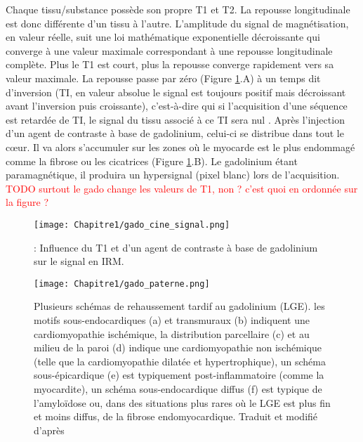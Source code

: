 Chaque tissu/substance possède son propre T1 et T2. La repousse longitudinale est donc différente d’un tissu à l’autre. L’amplitude du signal de magnétisation, en valeur réelle, suit une loi mathématique exponentielle décroissante qui converge à une valeur maximale correspondant à une repousse longitudinale complète. Plus le T1 est court, plus la repousse converge rapidement vers sa valeur maximale. La repousse passe par zéro (Figure \ref{fig:gado}.A) à un temps dit d’inversion (TI, en valeur absolue le signal est toujours positif mais décroissant avant l’inversion puis croissante), c’est-à-dire qui si l’acquisition d’une séquence est retardée de TI, le signal du tissu associé à ce TI sera nul \cite{Jenista2023}. Après l’injection d’un agent de contraste à base de gadolinium, celui-ci se distribue dans tout le cœur. Il va alors s’accumuler sur les zones où le myocarde est le plus endommagé comme la fibrose ou les cicatrices (Figure \ref{fig:gado}.B). Le gadolinium étant paramagnétique, il produira un hypersignal (pixel blanc) lors de l’acquisition.\\
\textcolor{red}{ TODO surtout le gado change les valeurs de T1, non ?}
\textcolor{red}{ c'est quoi en ordonnée sur la figure ?}
\begin{figure}[!htbp]
  \begin{center}
    \texttt{[image: Chapitre1/gado\_cine\_signal.png]}
     \end{center}
    \caption{: Influence du T1 et d’un agent de contraste à base de gadolinium sur le signal en IRM.}
  \label{fig:gado}
\end{figure}



\begin{figure}[!htbp]
  \begin{center}
    \texttt{[image: Chapitre1/gado\_paterne.png]}
     \end{center}
    \caption{Plusieurs schémas de rehaussement tardif au gadolinium (LGE). les motifs sous-endocardiques (a) et transmuraux (b) indiquent une cardiomyopathie ischémique, la distribution parcellaire (c) et au milieu de la paroi (d) indique une cardiomyopathie non ischémique (telle que la cardiomyopathie dilatée et hypertrophique), un schéma sous-épicardique (e) est typiquement post-inflammatoire (comme la myocardite), un schéma sous-endocardique diffus (f) est typique de l'amyloïdose ou, dans des situations plus rares où le LGE est plus fin et moins diffus, de la fibrose endomyocardique. Traduit et modifié d'après \cite{Barison2022-ok}}
  \label{fig:gado_paterne}
\end{figure}

